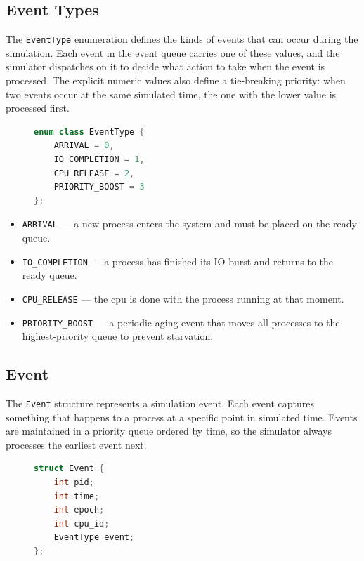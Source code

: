\documentclass[12pt]{article}
\begin{document}
\subsection{Event Types}

The \texttt{EventType} enumeration defines the kinds of events that can occur during the simulation. Each event in the event queue carries one of these values, and the simulator dispatches on it to decide what action to take when the event is processed. The explicit numeric values also define a tie-breaking priority: when two events occur at the same simulated time, the one with the lower value is processed first.

\begin{figure}[htbp]
\centering
\begin{lstlisting}[language=C++, caption={Enumeration of simulation event types.}, label={lst:event_type_enum}]
enum class EventType {
    ARRIVAL = 0,
    IO_COMPLETION = 1,
    CPU_RELEASE = 2,
    PRIORITY_BOOST = 3
};
\end{lstlisting}
\end{figure}

\begin{itemize}
    \item \texttt{ARRIVAL} — a new process enters the system and must be placed on the ready queue.
    \item \texttt{IO\_COMPLETION} — a process has finished its IO burst and returns to the ready queue.
    \item \texttt{CPU\_RELEASE} — the cpu is done with the process running at that moment.
    \item \texttt{PRIORITY\_BOOST} — a periodic aging event that moves all processes to the highest-priority queue to prevent starvation.
\end{itemize}

\subsection{Event}

The \texttt{Event} structure represents a simulation event. Each event captures something that happens to a process at a specific point in simulated time. Events are maintained in a priority queue ordered by time, so the simulator always processes the earliest event next.

\begin{figure}[htbp]
\centering
\begin{lstlisting}[language=C++, caption={Data structure representing a simulation event.}, label={lst:event_struct}]
struct Event {
    int pid;
    int time;
    int epoch;
    int cpu_id;
    EventType event;
};
\end{lstlisting}
\end{figure}
\end{document}

